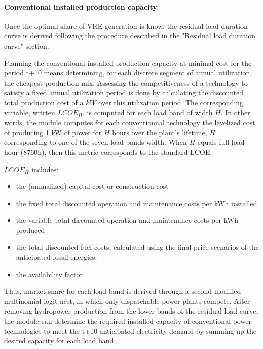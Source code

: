 \paragraph{Conventional installed production capacity}

Once the optimal share of VRE generation is know, the residual load duration curve is derived following the procedure described in the "Residual load duration curve" section. 



Planning the conventional installed production capacity at minimal cost for the period t+10 means determining, for each discrete segment of annual utilization, the cheapest production mix.
Assessing the competitiveness of a technology to satisfy a fixed annual utilization period is done by calculating the discounted total production cost of a 
$kW$ over this utilization period.
 The corresponding variable, written $LCOE_{H}$, is computed for each load band of width $H$. In other words, the module computes for each conventionnal technology the levelized cost of producing 1 kW of power for $H$ hours over the plant's lifetime, $H$ corresponding to one of the seven load bands width. When $H$ equals full load hour (8760h), then this metric corresponds to the standard LCOE. 

$LCOE_{H}$ includes:

\begin{itemize}
    \item the (annualized) capital cost or construction cost
    \item the fixed total discounted operation and maintenance costs per kWh installed
    \item the variable total discounted operation and maintenance costs per kWh produced
    \item the total discounted fuel costs, calculated using the final price scenarios of the anticipated fossil energies.
    \item  the availability factor
    
\end{itemize}



Thus, market share for each load band is derived through a second modified multinomial logit nest, in which only dispatchable power plants compete. After removing hydropower production from the  lower bands of the residual load curve, the module can determine the required installed capacity of conventional power technologies to meet the t+10 anticipated electricity demand by summing up the desired capacity for each load band.

